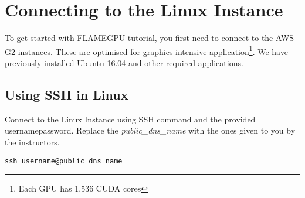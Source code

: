 \section{Connecting to the Linux Instance}\label{sec:aws}
To get started with FLAMEGPU tutorial, you first need to connect to the AWS G2 instances. These are optimised for graphics-intensive application\footnote{Each GPU has 1,536 CUDA cores}. We have previously installed Ubuntu 16.04 and other required applications.

\subsection{Using SSH in Linux}
Connect to the Linux Instance using SSH command and the provided username\/password. Replace the \textit{public\_dns\_name} with the ones given to you by the instructors.

\begin{verbatim}
ssh username@public_dns_name
\end{verbatim}

